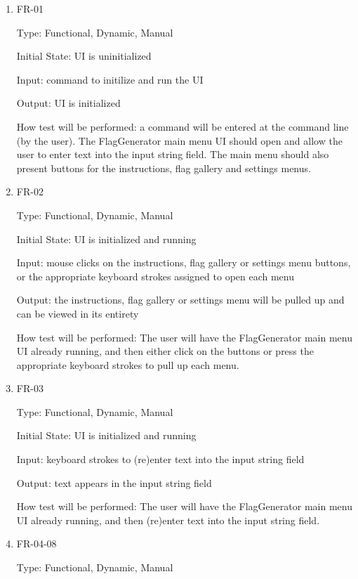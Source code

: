 \documentclass[12pt, titlepage]{article}
\begin{document}
\begin{enumerate}

\item{FR-01\\}

Type: Functional, Dynamic, Manual

Initial State: UI is uninitialized

Input: command to initilize and run the UI

Output: UI is initialized

How test will be performed: a command will be entered at the command line (by
the user). The FlagGenerator main menu UI should open and allow the user to
enter text into the input string field. The main menu should also present
buttons for the instructions, flag gallery and settings menus.
					
\item{FR-02\\}

Type: Functional, Dynamic, Manual

Initial State: UI is initialized and running

Input: mouse clicks on the instructions, flag gallery or settings menu
buttons, or the appropriate keyboard strokes assigned to open each menu

Output: the instructions, flag gallery or settings menu will be pulled up and
can be viewed in its entirety

How test will be performed: The user will have the FlagGenerator main menu UI
already running, and then either click on the buttons or press the appropriate
keyboard strokes to pull up each menu.

\item{FR-03\\}

Type: Functional, Dynamic, Manual

Initial State: UI is initialized and running

Input: keyboard strokes to (re)enter text into the input string field

Output: text appears in the input string field

How test will be performed: The user will have the FlagGenerator main menu UI
already running, and then (re)enter text into the input string field.

\item{FR-04-08\\}

Type: Functional, Dynamic, Manual


\end{enumerate}
\end{document}
